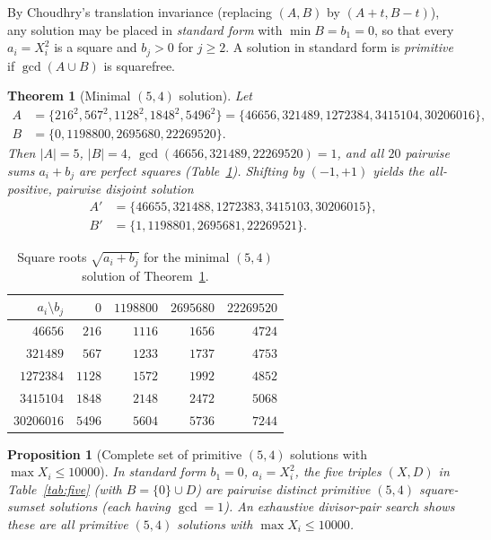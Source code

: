 \documentclass[11pt]{article}
\newtheorem{theorem}{Theorem}
\newtheorem{proposition}{Proposition}
\begin{document}
By Choudhry's translation invariance (replacing $(A, B)$ by $(A + t, B - t)$), any solution may be placed in \emph{standard form} with $\min B = b_1 = 0$, so that every $a_i = X_i^2$ is a square and $b_j > 0$ for $j \ge 2$. A solution in standard form is \emph{primitive} if $\gcd(A \cup B)$ is squarefree.

\begin{theorem}[Minimal $(5, 4)$ solution]\label{thm:54}
Let
\begin{align*}
A &= \{216^2, 567^2, 1128^2, 1848^2, 5496^2\} = \{46656, 321489, 1272384, 3415104, 30206016\}, \\
B &= \{0, 1198800, 2695680, 22269520\}.
\end{align*}
Then $|A| = 5$, $|B| = 4$, $\gcd(46656, 321489, 22269520) = 1$, and all $20$ pairwise sums $a_i + b_j$ are perfect squares (Table~\ref{tab:54}). Shifting by $(-1, +1)$ yields the all-positive, pairwise disjoint solution
\begin{align*}
A' &= \{46655, 321488, 1272383, 3415103, 30206015\}, \\
B' &= \{1, 1198801, 2695681, 22269521\}.
\end{align*}
\end{theorem}

\begin{table}[ht]
\centering
\caption{Square roots $\sqrt{a_i + b_j}$ for the minimal $(5, 4)$ solution of Theorem~\ref{thm:54}.}
\label{tab:54}
\begin{tabular}{rrrrr}
\toprule
$a_i \setminus b_j$ & $0$ & $1198800$ & $2695680$ & $22269520$ \\
\midrule
$46656$    & $216$  & $1116$ & $1656$ & $4724$ \\
$321489$   & $567$  & $1233$ & $1737$ & $4753$ \\
$1272384$  & $1128$ & $1572$ & $1992$ & $4852$ \\
$3415104$  & $1848$ & $2148$ & $2472$ & $5068$ \\
$30206016$ & $5496$ & $5604$ & $5736$ & $7244$ \\
\bottomrule
\end{tabular}
\end{table}

\begin{proposition}[Complete set of primitive $(5, 4)$ solutions with $\max X_i \le 10000$]\label{prop:five}
In standard form $b_1 = 0$, $a_i = X_i^2$, the five triples $(X, D)$ in Table~\ref{tab:five} (with $B = \{0\} \cup D$) are pairwise distinct primitive $(5, 4)$ square-sumset solutions (each having $\gcd = 1$). An exhaustive divisor-pair search shows these are all primitive $(5, 4)$ solutions with $\max X_i \le 10000$.
\end{proposition}
\end{document}
